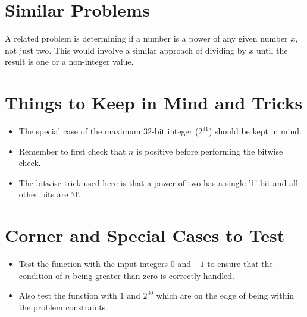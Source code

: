 \section*{Similar Problems}
A related problem is determining if a number is a power of any given number \(x\), not just two. This would involve a similar approach of dividing by \(x\) until the result is one or a non-integer value.

\section*{Things to Keep in Mind and Tricks}
\begin{itemize}
    \item The special case of the maximum 32-bit integer (\(2^{31}\)) should be kept in mind.
    \item Remember to first check that \(n\) is positive before performing the bitwise check.
    \item The bitwise trick used here is that a power of two has a single '1' bit and all other bits are '0'.
\end{itemize}

\section*{Corner and Special Cases to Test}
\begin{itemize}
    \item Test the function with the input integers \(0\) and \(-1\) to ensure that the condition of \(n\) being greater than zero is correctly handled.
    \item Also test the function with \(1\) and \(2^{30}\) which are on the edge of being within the problem constraints.
\end{itemize}
